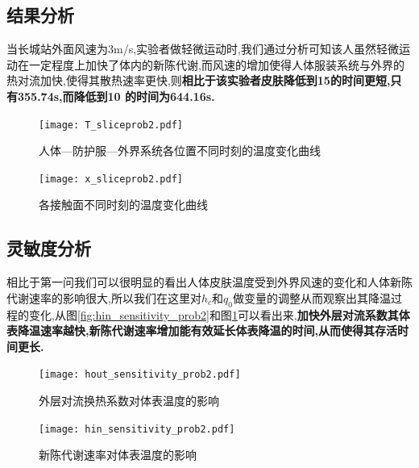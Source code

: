 \documentclass{whutmod}
\begin{document}
\subsection{结果分析}
当长城站外面风速为3m/s,实验者做轻微运动时,我们通过分析可知该人虽然轻微运动在一定程度上加快了体内的新陈代谢,而风速的增加使得人体服装系统与外界的热对流加快,使得其散热速率更快,则\textbf{相比于该实验者皮肤降低到15\textcelsius 的时间更短,只有355.74s,而降低到10 \textcelsius 的时间为644.16s.}
\begin{figure}[!h]
	\begin{minipage}[t]{0.48\textwidth}
		\centering
	\texttt{[image: T\_sliceprob2.pdf]}
\caption{人体—防护服—外界系统各位置不同时刻的温度变化曲线}
	\end{minipage}
	\begin{minipage}[t]{0.48\textwidth}
		\centering
	\texttt{[image: x\_sliceprob2.pdf]}
\caption{各接触面不同时刻的温度变化曲线}
	\end{minipage}
\end{figure}

\subsection{灵敏度分析}
相比于第一问我们可以很明显的看出人体皮肤温度受到外界风速的变化和人体新陈代谢速率的影响很大,所以我们在这里对$h_c$和$q_0$做变量的调整从而观察出其降温过程的变化,从图\ref{fig:hin_sensitivity_prob2}和图\ref{fig:hout_sensitivity_prob2}可以看出来,\textbf{加快外层对流系数其体表降温速率越快,新陈代谢速率增加能有效延长体表降温的时间,从而使得其存活时间更长.}
\begin{figure}[!h]
	\begin{minipage}[t]{0.48\textwidth}
		\centering
	\texttt{[image: hout\_sensitivity\_prob2.pdf]}
\caption{外层对流换热系数对体表温度的影响}
\label{fig:hin_sensitivity_prob2}
	\end{minipage}
	\begin{minipage}[t]{0.48\textwidth}
		\centering
	\texttt{[image: hin\_sensitivity\_prob2.pdf]}
\caption{新陈代谢速率对体表温度的影响}
\label{fig:hout_sensitivity_prob2}
	\end{minipage}
\end{figure}
%
\end{document}
